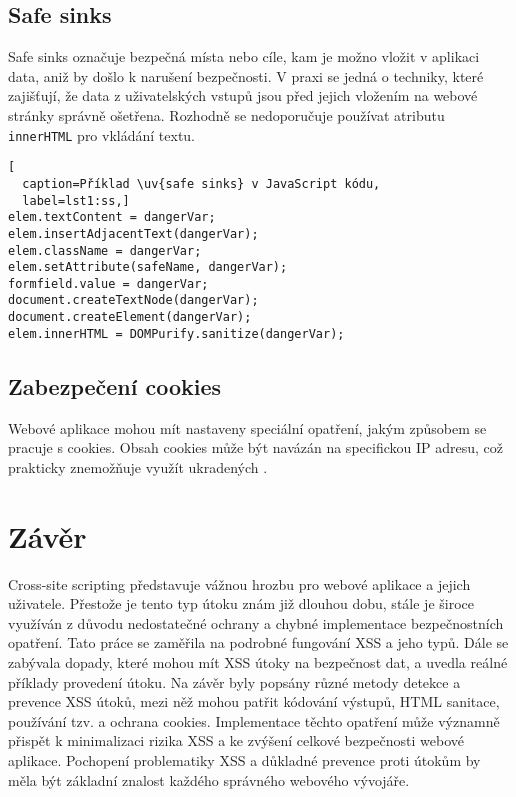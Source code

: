 \documentclass[11pt, conference, a4paper]{IEEEtran}
\begin{document}
\subsection{Safe sinks}
Safe sinks označuje bezpečná místa nebo cíle, kam je možno vložit v aplikaci data, aniž by došlo k narušení bezpečnosti. V praxi se jedná o techniky, které zajišťují, že data z uživatelských vstupů jsou před jejich vložením na webové stránky správně ošetřena. Rozhodně se nedoporučuje používat atributu \texttt{innerHTML} pro vkládání textu.~\cite{Prevention-XSS-owasp}

\begin{lstlisting}[
  caption=Příklad \uv{safe sinks} v JavaScript kódu,
  label=lst1:ss,]
elem.textContent = dangerVar;
elem.insertAdjacentText(dangerVar);
elem.className = dangerVar;
elem.setAttribute(safeName, dangerVar);
formfield.value = dangerVar;
document.createTextNode(dangerVar);
document.createElement(dangerVar);
elem.innerHTML = DOMPurify.sanitize(dangerVar);
\end{lstlisting}


\subsection{Zabezpečení cookies}
Webové aplikace mohou mít nastaveny speciální opatření, jakým způsobem se pracuje s cookies. Obsah cookies může být navázán na specifickou IP adresu, což prakticky znemožňuje využít ukradených .~\cite{XSS-cloudflare}


\section{Závěr}
Cross-site scripting představuje vážnou hrozbu pro webové aplikace a jejich uživatele. Přestože je tento typ útoku znám již dlouhou dobu, stále je široce využíván z důvodu nedostatečné ochrany a chybné implementace bezpečnostních opatření. Tato práce se zaměřila na podrobné fungování XSS a jeho typů. Dále se zabývala dopady, které mohou mít XSS útoky na bezpečnost dat, a uvedla reálné příklady provedení útoku. Na závěr byly popsány různé metody detekce a prevence XSS útoků, mezi něž mohou patřit kódování výstupů, HTML sanitace, používání tzv.  a ochrana cookies. Implementace těchto opatření může významně přispět k minimalizaci rizika XSS a ke zvýšení celkové bezpečnosti webové aplikace. Pochopení problematiky XSS a důkladné prevence proti útokům by měla být základní znalost každého správného webového vývojáře.


  
  
\end{document}
